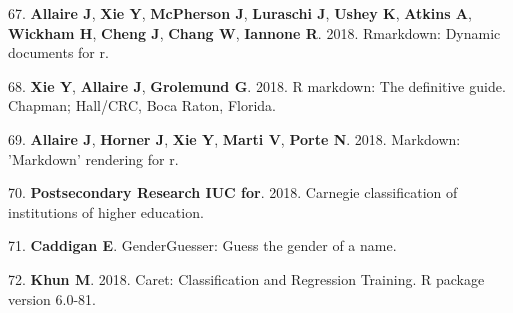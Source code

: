 \documentclass[11pt,]{article}
\begin{document}
\hypertarget{ref-rmd_rstudio}{}
67. \textbf{Allaire J}, \textbf{Xie Y}, \textbf{McPherson J},
\textbf{Luraschi J}, \textbf{Ushey K}, \textbf{Atkins A},
\textbf{Wickham H}, \textbf{Cheng J}, \textbf{Chang W}, \textbf{Iannone
R}. 2018. Rmarkdown: Dynamic documents for r.

\hypertarget{ref-rmd_book}{}
68. \textbf{Xie Y}, \textbf{Allaire J}, \textbf{Grolemund G}. 2018. R
markdown: The definitive guide. Chapman; Hall/CRC, Boca Raton, Florida.

\hypertarget{ref-markdown}{}
69. \textbf{Allaire J}, \textbf{Horner J}, \textbf{Xie Y}, \textbf{Marti
V}, \textbf{Porte N}. 2018. Markdown: 'Markdown' rendering for r.

\hypertarget{ref-Carnegie2018}{}
70. \textbf{Postsecondary Research IUC for}. 2018. Carnegie
classification of institutions of higher education.

\hypertarget{ref-caddigan_genderguesser}{}
71. \textbf{Caddigan E}. GenderGuesser: Guess the gender of a name.

\hypertarget{ref-khun_caret_2018}{}
72. \textbf{Khun M}. 2018. Caret: Classification and Regression
Training. R package version 6.0-81.
\end{document}
